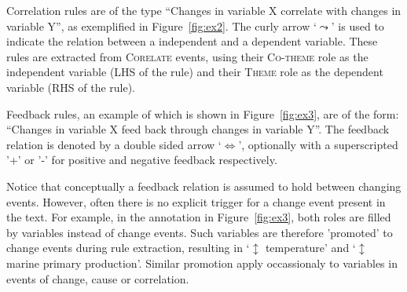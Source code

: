 \documentclass[10pt, a4paper]{article}
\newcommand{\tag}[1]{\textsc{#1}}
\begin{document}
Correlation rules are of the type ``Changes in variable X correlate with changes in variable Y'', as exemplified in Figure~\ref{fig:ex2}.
The curly arrow `$\leadsto$' is used to indicate the relation between a independent and a dependent variable.
These rules are extracted from \tag{Corelate} events, using their \tag{Co-theme} role as the independent variable (LHS of the rule) and their \tag{Theme} role as the dependent variable (RHS of the rule). 

Feedback rules, an example of which is shown in Figure~\ref{fig:ex3}, are of the form: ``Changes in variable X feed back through changes in variable Y''.
The feedback relation is denoted by a double sided arrow `$\Longleftrightarrow$', optionally with a superscripted '+' or '-' for positive and negative feedback respectively.

Notice that conceptually a feedback relation is assumed to hold between changing events.
However, often there is no explicit trigger for a change event present in the text.
For example, in the annotation in Figure~\ref{fig:ex3}, both roles are filled by variables instead of change events.
Such variables are therefore 'promoted' to change events during rule extraction, resulting in `$\updownarrow$ temperature' and `$\updownarrow$ marine primary production'.
Similar promotion apply occassionaly to variables in events of change, cause or correlation.


\setlength{\fboxsep}{10pt}
\end{document}
